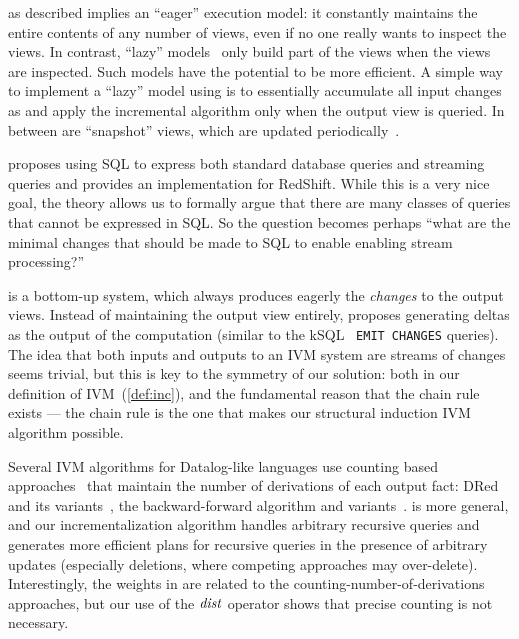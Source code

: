 \dbsp as described implies an ``eager'' execution model: it constantly
maintains the entire contents of any number of views, even if no one
really wants to inspect the views.  In contrast, ``lazy''
models~\cite{hanson-sigmod87} only build part of the views when the
views are inspected.  Such models have the potential to be more
efficient.  A simple way to implement a ``lazy'' model using \dbsp is
to essentially accumulate all input changes as \zrs and apply the
incremental algorithm only when the output view is queried.  In
between are ``snapshot'' views, which are updated
periodically~\cite{colby-sigmod97}.

\cite{bengoli-sigmod19} proposes using SQL to express both standard
database queries and streaming queries and provides an implementation
for RedShift.  While this is a very nice goal, the \dbsp theory allows
us to formally argue that there are many classes of queries that
cannot be expressed in SQL.  So the question becomes perhaps ``what
are the minimal changes that should be made to SQL to enable enabling
stream processing?''

\dbsp is a bottom-up system, which always produces eagerly the
\emph{changes} to the output views.  Instead of maintaining the output
view entirely, \dbsp proposes generating deltas as the output of the
computation (similar to the kSQL~\cite{jafarpour-edbt19} \texttt{EMIT
  CHANGES} queries).  The idea that both inputs and outputs to an IVM
system are streams of changes seems trivial, but this is key to the
symmetry of our solution: both in our definition of
IVM~(\ref{def:inc}), and the fundamental reason that the chain rule
exists --- the chain rule is the one that makes our structural
induction IVM algorithm possible.

Several IVM algorithms for Datalog-like languages use counting based
approaches~\cite{Dewan-iis92,motik-aaai15} that maintain the number of
derivations of each output fact: DRed~\cite{gupta-sigmod93} and its
variants~\cite{Ceri-VLDB91,Wolfson-sigmod91,Staudt-vldb96,Kotowski-rr11,Lu-sigmod95,Apt-sigmod87},
the backward-forward algorithm and
variants~\cite{motik-aaai15,Harrison-wdd92,motik-ai19}.  \dbsp is more
general, and our incrementalization algorithm handles arbitrary
recursive queries and generates more efficient plans for recursive
queries in the presence of arbitrary updates (especially deletions,
where competing approaches may over-delete).  Interestingly, the \zrs
weights in \dbsp are related to the counting-number-of-derivations
approaches, but our use of the $\mathit{dist}$ operator shows that precise
counting is not necessary.

